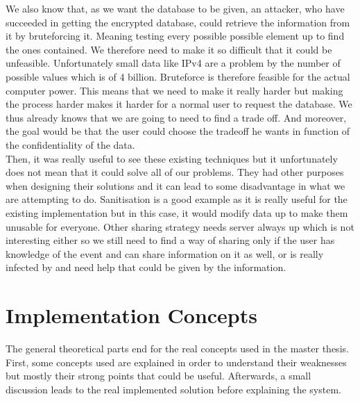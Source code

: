 \documentclass{eplmastersthesis}
\begin{document}
We also know that, as we want the database to be given, an attacker, who have succeeded in getting the encrypted database, could retrieve the information from it by bruteforcing it. Meaning testing every possible possible element up to find the ones contained. We therefore  need to make it so difficult that it could be unfeasible.
Unfortunately small data like IPv4 are a problem by the number of possible values which is of 4 billion. Bruteforce is therefore feasible for the actual computer power. This means that we need to make it really harder but making the process harder makes it harder for a normal user to request the database. We thus already knows that we are going to need to find a trade off. And moreover, the goal would be that the user could choose the tradeoff he wants in function of the  confidentiality of the data.\\

Then, it was really useful to see these existing techniques but it unfortunately does not mean that it could solve all of our problems. They had other purposes when designing their solutions and it can lead to some disadvantage in what we are attempting to do.
Sanitisation is a good example as it is really useful for the existing implementation but in this case, it would modify data up to make them unusable for everyone.
Other sharing strategy needs server always up which is not interesting either so we still need to find a way of sharing only if the user has knowledge of the event and can share information on it as well, or is really infected by and need help that could be given by the information.\\


\chapter{Implementation Concepts}
The general theoretical parts end for the real concepts used in the master thesis. First, some concepts used are explained in order to understand their weaknesses but mostly their strong points that could be useful. Afterwards, a small discussion leads to the real implemented solution before explaining the system.
\end{document}
